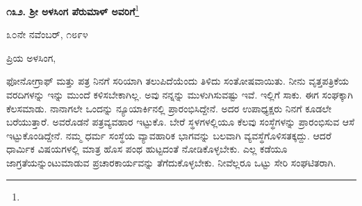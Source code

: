 \begin{center}
\textbf{೧೩೨. ಶ‍್ರೀ ಅಳಸಿಂಗ ಪೆರುಮಾಳ್ ಅವರಿಗೆ}\footnote{}
\end{center}
\vspace{-0.3cm}

\begin{flushright}
೩೦ನೇ ನವೆಂಬರ್, ೧೮೯೪
\end{flushright}
\vspace{-0.3cm}

\noindent
ಪ್ರಿಯ ಅಳಸಿಂಗ,

ಫೋನೋಗ್ರಾಫ್ ಮತ್ತು ಪತ್ರ ನಿನಗೆ ಸರಿಯಾಗಿ ತಲುಪಿದೆಯೆಂದು ತಿಳಿದು ಸಂತೋಷವಾಯಿತು. ನೀನು ವೃತ್ತಪತ್ರಿಕೆಯ ವರದಿಗಳನ್ನು ಇನ್ನು ಮುಂದೆ ಕಳಿಸಬೇಕಾಗಿಲ್ಲ. ಅವು ನನ್ನನ್ನು ಮುಳುಗಿಸುವಷ್ಟು ಇವೆ. ಇಲ್ಲಿಗೆ ಸಾಕು. ಈಗ ಸಂಘಕ್ಕಾಗಿ ಕೆಲಸಮಾಡು. ನಾನಾಗಲೇ ಒಂದನ್ನು ನ್ಯೂಯಾರ್ಕಿನಲ್ಲಿ ಪ್ರಾರಂಭಿಸಿದ್ದೇನೆ. ಅದರ ಉಪಾಧ್ಯಕ್ಷರು ನಿನಗೆ ಕೂಡಲೇ ಬರೆಯುತ್ತಾರೆ. ಅವರೊಡನೆ ಪತ್ರವ್ಯವಹಾರ ಇಟ್ಟುಕೊ. ಬೇರೆ ಸ್ಥಳಗಳಲ್ಲಿಯೂ ಕೆಲವು ಸಂಸ್ಥೆಗಳನ್ನು ಪ್ರಾರಂಭಿಸುವ ಆಸೆ ಇಟ್ಟುಕೊಂಡಿದ್ದೇನೆ. ನಮ್ಮ ಧರ್ಮ ಸಂಸ್ಥೆಯ ವ್ಯಾವಹಾರಿಕ ಭಾಗವನ್ನು ಬಲವಾಗಿ ವ್ಯವಸ್ಥೆಗೊಳಿಸತಕ್ಕದ್ದು. ಆದರೆ ಧಾರ್ಮಿಕ ವಿಷಯಗಳಲ್ಲಿ ಮಾತ್ರ ಹೊಸ ಪಂಥ ಹುಟ್ಟದಂತೆ ನೋಡಿಕೊಳ್ಳಬೇಕು. ಎಲ್ಲ ಕಡೆಯೂ ಜಾಗ್ರತೆಯನ್ನುಂಟುಮಾಡುವ ಪ್ರಚಾರಕಾರ್ಯವನ್ನು ತೆಗೆದುಕೊಳ್ಳಬೇಕು. ನೀವೆಲ್ಲರೂ ಒಟ್ಟು ಸೇರಿ ಸಂಘಟಿತರಾಗಿ.

